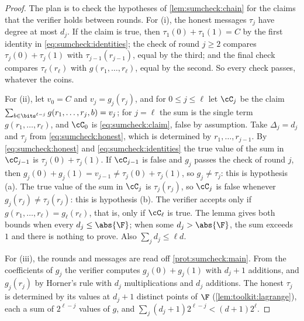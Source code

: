 \begin{refsection}
\begin{proof}
The plan is to check the hypotheses of \cref{lem:sumcheck:chain} for the claims that the verifier holds between rounds. For (i), the honest messages $\tau_j$ have degree at most $d_j$. If the claim is true, then $\tau_1(0)+\tau_1(1)=C$ by the first identity in \eqref{eq:sumcheck:identities}; the check of round $j\ge2$ compares $\tau_j(0)+\tau_j(1)$ with $\tau_{j-1}(r_{j-1})$, equal by the third; and the final check compares $\tau_\ell(r_\ell)$ with $g(r_1,\dots,r_\ell)$, equal by the second. So every check passes, whatever the coins.

For (ii), let $v_0=C$ and $v_j=g_j(r_j)$, and for $0\le j\le\ell$ let $\cC_j$ be the claim $\sum_{b\in\bits^{\ell-j}}g(r_1,\dots,r_j,b)=v_j$; for $j=\ell$ the sum is the single term $g(r_1,\dots,r_\ell)$, and $\cC_0$ is \eqref{eq:sumcheck:claim}, false by assumption. Take $\Delta_j=d_j$ and $\tau_j$ from \eqref{eq:sumcheck:honest}, which is determined by $r_1,\dots,r_{j-1}$. By \eqref{eq:sumcheck:honest} and \eqref{eq:sumcheck:identities} the true value of the sum in $\cC_{j-1}$ is $\tau_j(0)+\tau_j(1)$. If $\cC_{j-1}$ is false and $g_j$ passes the check of round $j$, then $g_j(0)+g_j(1)=v_{j-1}\ne\tau_j(0)+\tau_j(1)$, so $g_j\ne\tau_j$: this is hypothesis (a). The true value of the sum in $\cC_j$ is $\tau_j(r_j)$, so $\cC_j$ is false whenever $g_j(r_j)\ne\tau_j(r_j)$: this is hypothesis (b). The verifier accepts only if $g(r_1,\dots,r_\ell)=g_\ell(r_\ell)$, that is, only if $\cC_\ell$ is true. The lemma gives both bounds when every $d_j\le\abs{\F}$; when some $d_j>\abs{\F}$, the sum exceeds $1$ and there is nothing to prove. Also $\sum_jd_j\le\ell d$.

For (iii), the rounds and messages are read off \cref{prot:sumcheck:main}. From the coefficients of $g_j$ the verifier computes $g_j(0)+g_j(1)$ with $d_j+1$ additions, and $g_j(r_j)$ by Horner's rule with $d_j$ multiplications and $d_j$ additions. The honest $\tau_j$ is determined by its values at $d_j+1$ distinct points of $\F$ (\cref{lem:toolkit:lagrange}), each a sum of $2^{\ell-j}$ values of $g$, and $\sum_j(d_j+1)2^{\ell-j}<(d+1)2^\ell$.
\end{proof}



\end{refsection}
